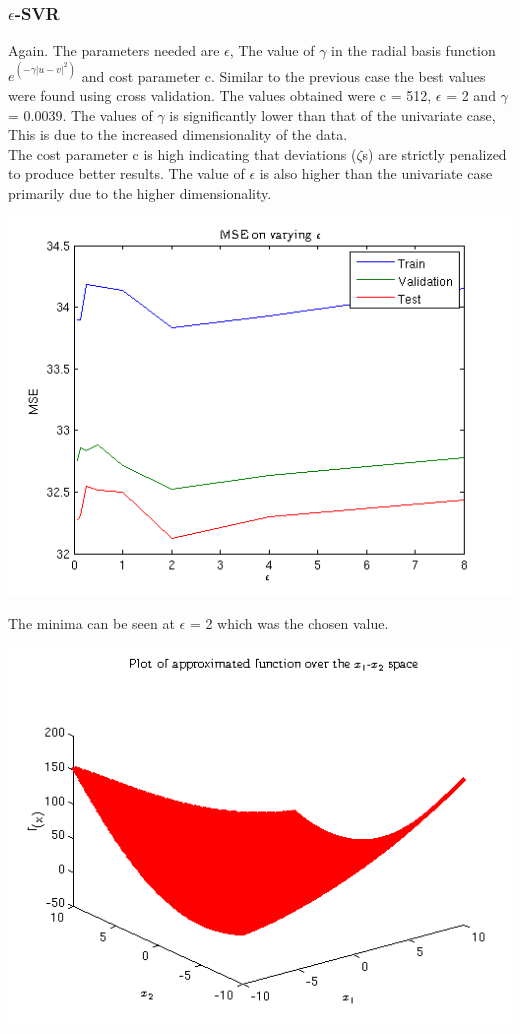 \documentclass{article}
\begin{document}
\subsubsection{$\epsilon$-SVR}
Again. The parameters needed are $\epsilon$, The value of $\gamma$ in the radial basis function $e^{(-\gamma|u-v|^2)}$ and cost parameter c. Similar to the previous case the best values were found using cross validation. The values obtained were c = 512, $\epsilon$ = 2 and $\gamma$ = 0.0039. The values of $\gamma$ is significantly lower than that of the univariate case, This is due to the increased dimensionality of the data. 
\\[5pt]
The cost parameter c is high indicating that deviations ($\zeta$s) are strictly penalized to produce better results. The value of $\epsilon$ is also higher than the univariate case primarily due to the higher dimensionality.
\begin{center}
\includegraphics[scale=1]{Regression/bivar/eps/mse}
\end{center}
The minima can be seen at $\epsilon$ = 2 which was the chosen value.
\begin{center}
\includegraphics[scale=1]{Regression/bivar/eps/fun}
\end{center}
\end{document}
